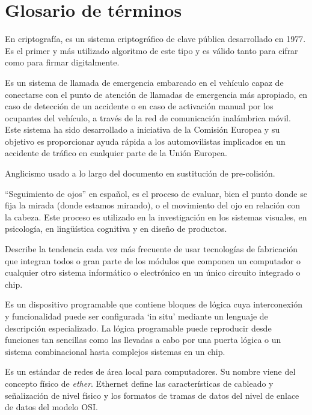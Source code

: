 \section{Glosario de términos}

\begin{description}[style=multiline, leftmargin=4cm]

  \item[\textbf{Cifrado RSA-256:}] En criptografía, es un sistema criptográfico de clave pública desarrollado en 1977. Es el primer y más utilizado algoritmo de este tipo y es válido tanto para cifrar como para firmar digitalmente.
  \item[\textbf{Protocolo e-call:}] Es un sistema de llamada de emergencia embarcado en el vehículo capaz de conectarse con el punto de atención de llamadas de emergencia más apropiado, en caso de detección de un accidente o en caso de activación manual por los ocupantes del vehículo, a través de la red de comunicación inalámbrica móvil. Este sistema ha sido desarrollado a iniciativa de la Comisión Europea y su objetivo es proporcionar ayuda rápida a los automovilistas implicados en un accidente de tráfico en cualquier parte de la Unión Europea.
  \item[\textbf{Pre-crash:}] Anglicismo usado a lo largo del documento en sustitución de pre-colisión.
  \item[\textbf{Eye Tracking:}] ``Seguimiento de ojos'' en español, es el proceso de evaluar, bien el punto donde se fija la mirada (donde estamos mirando), o el movimiento del ojo en relación con la cabeza. Este proceso es utilizado en la investigación en los sistemas visuales, en psicología, en lingüística cognitiva y en diseño de productos.
  \item[\textbf{System-on-chip (SOC):}] Describe la tendencia cada vez más frecuente de usar tecnologías de fabricación que integran todos o gran parte de los módulos que componen un computador o cualquier otro sistema informático o electrónico en un único circuito integrado o chip.
  \item[\textbf{Field Programmable Gate Array (FPGA):}] Es un dispositivo programable que contiene bloques de lógica cuya interconexión y funcionalidad puede ser configurada ‘in situ’ mediante un lenguaje de descripción especializado. La lógica programable puede reproducir desde funciones tan sencillas como las llevadas a cabo por una puerta lógica o un sistema combinacional hasta complejos sistemas en un chip.
  \item[\textbf{Ethernet:}] Es un estándar de redes de área local para computadores. Su nombre viene del concepto físico de \textit{ether}. Ethernet define las características de cableado y señalización de nivel físico y los formatos de tramas de datos del nivel de enlace de datos del modelo OSI.

\end{description}

